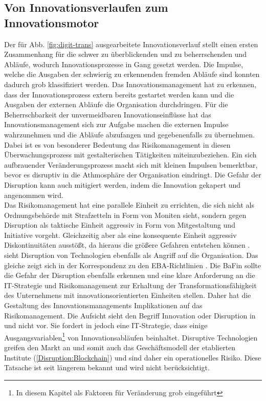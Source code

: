 \subsection{Von Innovationsverlaufen zum Innovationsmotor}
Der für Abb. \ref{fig:digit-trans} ausgearbeitete Innovationsverlauf stellt einen ersten Zusammenhang für die schwer zu überblickenden und zu beherrschenden und Abläufe, wodurch Innovationsprozesse in Gang gesetzt werden. Die Impulse, welche die Ausgaben der schwierig zu erkennenden fremden Abläufe sind konnten dadurch grob klassifiziert werden. Das Innovationsmanagement hat zu erkennen, dass der Innovationsprozess extern bereits gestartet werden kann und die Ausgaben der externen Abläufe die Organisation durchdringen. Für die Beherrschbarkeit der unvermeidbaren Innovationseinflüsse hat das Innovationsmanagement sich zur Aufgabe machen die externen Impulse wahrzunehmen und die Abläufe abzufangen und gegebenenfalls zu übernehmen.
Dabei ist es von besonderer Bedeutung das Risikomanagement in diesen Überwachungsprozess mit gestalterischen Tätigkeiten miteinzubeziehen. Ein sich aufbrauender Veränderungsprozess macht sich mit kleinen Impulsen bemerktbar, bevor es disruptiv in die Athmosphäre der Organisation eindringt. Die Gefahr der Disruption kann auch mitigiert werden, indem die Innovation gekapert und angenommen wird.
\medskip
\\
Das Risikomanagement hat eine parallele Einheit zu errichten, die sich nicht als Ordnungsbehörde mit Strafzetteln in Form von Moniten sieht, sondern gegen Disruption als taktische Einheit aggressiv in Form von Mitgestaltung und Initiative vorgeht. Gleichzeitig aber als eine konsequente Einheit aggressiv Diskontinuitäten ausstößt, da hieraus die größere Gefahren entstehen können \cite{Fernandez:2020}.
\medskip
\\
\citet{Fernandez:2020} sieht Disruption von Technologien ebenfalls als Angriff auf die Organisation. Das gleiche zeigt sich in der Korrespondenz zu den EBA-Richtlinien \cite{eba:2019}. Die \ac{BaFin} sollte die Gefahr der Disruption ebenfalls erkennen und eine klare Anforderung an die IT-Strategie und Risikomanagement zur Erhaltung der Transformationsfähigkeit des Unternehmens mit innovationsorientierten Einheiten stellen.
Daher hat die Gestaltung des Innovationsmanagements Implikationen auf das Risikomanagement. Die Aufsicht sieht den Begriff Innovation oder Disruption in \cite{MaRisk:2017} und \cite{BAIT:2018} nicht vor. Sie fordert in \cite{BAIT:2018} jedoch eine IT-Strategie, dass einige Ausgangsvariablen\footnote{In diesem Kapitel als Faktoren für Veränderung grob eingeführt} von Innovationsabläufen beinhaltet. 
Disruptive Technologien greifen den Markt an \cite{Fernandez:2020} und somit auch das Geschäftsmodell der etablierten Institute (\ref{Disruption:Blockchain}) und sind daher ein operationelles Risiko. Diese Tatsache ist seit längerem bekannt \cite{Ganswindt2006} und wird nicht berücksichtigt.
\medskip
\\
